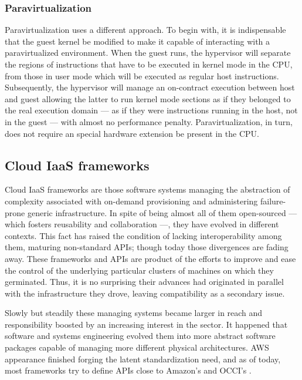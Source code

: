 \subsubsection{Paravirtualization}\label{subsubsec:paravirt}
\noindent Paravirtualization uses a different approach. To begin with, it is indispensable that the guest kernel be modified to make it capable of interacting with a paravirtualized environment. When the guest runs, the hypervisor will separate the regions of instructions that have to be executed in kernel mode in the CPU, from those in user mode which will be executed as regular host instructions. Subsequently, the hypervisor will manage an on-contract execution between host and guest allowing the latter to run kernel mode sections as if they belonged to the real execution domain --- as if they were instructions running in the host, not in the guest --- with almost no performance penalty. Paravirtualization, in turn, does not require an special hardware extension be present in the CPU.

\subsection{Cloud IaaS frameworks}\label{subsec:frameworksiaas}
\noindent Cloud IaaS frameworks are those software systems managing the abstraction of complexity associated with on-demand provisioning and administering failure-prone generic infrastructure. In spite of being almost all of them open-sourced --- which fosters reusability and collaboration ---, they have evolved in different contexts. This fact has raised the condition of lacking interoperability among them, maturing non-standard APIs; though today those divergences are fading away. These frameworks and APIs are product of the efforts to improve and ease the control of the underlying particular clusters of machines on which they germinated. Thus, it is no surprising their advances had originated in parallel with the infrastructure they drove, leaving compatibility as a secondary issue.

Slowly but steadily these managing systems became larger in reach and responsibility boosted by an increasing interest in the sector. It happened that software and systems engineering evolved them into more abstract software packages capable of managing more different physical architectures. AWS appearance finished forging the latent standardization need, and as of today, most frameworks try to define APIs close to Amazon's and OCCI's \cite{occisdraft}.


